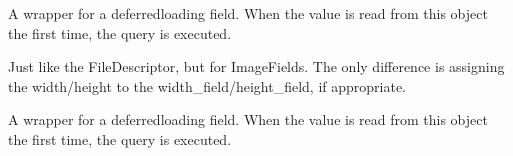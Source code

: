 \documentclass[letterpaper,10pt,english]{sphinxmanual}
\begin{document}
\begin{fulllineitems}
\begin{fulllineitems}
\label{\detokenize{pages_app.models:id23}}
\pysigstartsignatures
\pysigline
{}
\pysigstopsignatures
\end{fulllineitems}


\begin{fulllineitems}
\label{\detokenize{pages_app.models:pages_app.models.Block.id}}
\pysigstartsignatures
\pysigline
{}
\pysigstopsignatures
\sphinxAtStartPar
A wrapper for a deferred\sphinxhyphen{}loading field. When the value is read from this
object the first time, the query is executed.

\end{fulllineitems}


\begin{fulllineitems}
\label{\detokenize{pages_app.models:id24}}
\pysigstartsignatures
\pysigline
{}
\pysigstopsignatures
\sphinxAtStartPar
Just like the FileDescriptor, but for ImageFields. The only difference is
assigning the width/height to the width\_field/height\_field, if appropriate.

\end{fulllineitems}


\begin{fulllineitems}
\label{\detokenize{pages_app.models:id25}}
\pysigstartsignatures
\pysigline
{}
\pysigstopsignatures
\sphinxAtStartPar
A wrapper for a deferred\sphinxhyphen{}loading field. When the value is read from this
object the first time, the query is executed.

\end{fulllineitems}



\end{fulllineitems}
\end{document}

